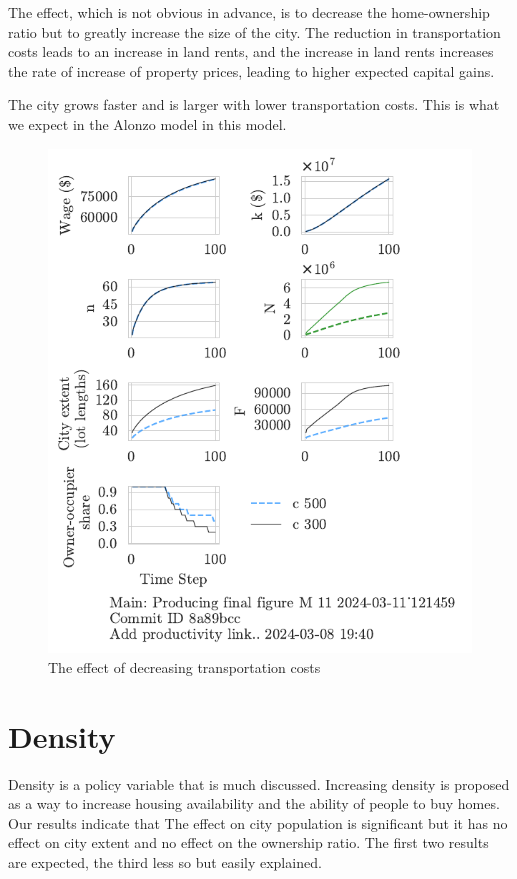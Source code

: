 The effect, which is not obvious in advance, is to decrease the home-ownership ratio but to greatly increase the size of the city. The reduction in transportation costs leads to an increase in land rents, and the increase in land rents increases the rate of increase of property prices, leading to higher expected capital gains.

The city grows faster and is larger with lower transportation costs. This is what we expect in the Alonzo model in this model.


\begin{figure}[h!t]
    \centering
    \includegraphics[scale=.8, trim={0 1.4cm 0 0},clip]{fig/c-Main-121459.pdf}
    \caption{The effect of decreasing transportation costs}
    \label{fig:c_ownership_trajectory}
\end{figure}


\newpage
\section{Density}
Density is a policy variable that is much discussed. Increasing density is proposed as a way to increase housing availability and the ability of people to buy homes. Our results indicate that The effect on city population is significant but it has no effect on city extent and no effect on the ownership ratio. The first two results are expected, the third less so but easily explained. 

